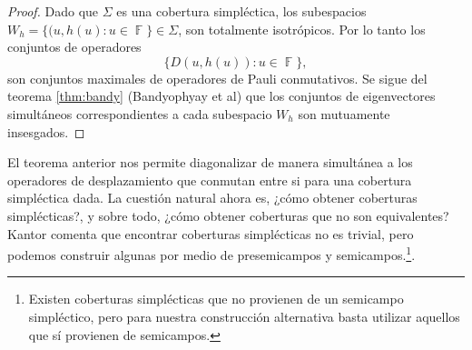 \documentclass[a4paper]{report}
\DeclareMathOperator{\F}{\mathbb{F}}
\DeclareMathOperator{\tr}{tr}
\begin{document}
  \begin{proof}
    Dado que $\Sigma$ es una cobertura simpléctica, los
    subespacios $W_h = \{(u, h(u) : u \in \F\} \in \Sigma$,
    son totalmente isotrópicos. Por lo tanto los conjuntos
    de operadores
    \[
      \{D(u,h(u)) : u \in \F\}, 
    \] 
    son conjuntos maximales de operadores de Pauli
    conmutativos. Se sigue del teorema \ref{thm:bandy}
    (Bandyophyay et al) que los conjuntos de eigenvectores
    simultáneos correspondientes a cada subespacio $W_h$ son
    mutuamente insesgados.
  \end{proof}
  El teorema anterior nos permite diagonalizar de manera
  simultánea a los operadores de desplazamiento que conmutan
  entre si para una cobertura simpléctica dada.  La cuestión
  natural ahora es, ¿cómo obtener coberturas simplécticas?, y
  sobre todo, ¿cómo obtener coberturas que no son equivalentes?
  Kantor comenta que encontrar coberturas simplécticas no es
  trivial, pero podemos construir algunas por medio de
  presemicampos y semicampos.\footnote{Existen coberturas
    simplécticas que no provienen de un semicampo
    simpléctico, pero para nuestra construcción alternativa
  basta utilizar aquellos que sí provienen de semicampos.}.
\end{document}
